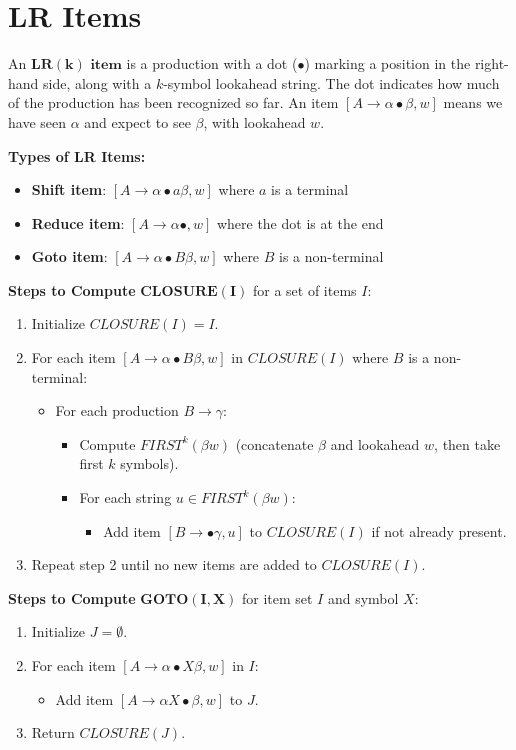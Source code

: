 \section{LR Items}

An $\mathbf{LR(k) \text{ item}}$ is a production with a dot ($\bullet$) marking a position in the right-hand side, along with a $k$-symbol lookahead string. The dot indicates how much of the production has been recognized so far. An item $[A \to \alpha \bullet \beta, w]$ means we have seen $\alpha$ and expect to see $\beta$, with lookahead $w$.

\textbf{Types of LR Items:}
\begin{itemize}
\item \textbf{Shift item}: $[A \to \alpha \bullet a \beta, w]$ where $a$ is a terminal
\item \textbf{Reduce item}: $[A \to \alpha \bullet, w]$ where the dot is at the end
\item \textbf{Goto item}: $[A \to \alpha \bullet B \beta, w]$ where $B$ is a non-terminal
\end{itemize}

\textbf{Steps to Compute} $\mathbf{CLOSURE(I)}$ for a set of items $I$:
\begin{enumerate}
\item Initialize $CLOSURE(I) = I$.
\item For each item $[A \to \alpha \bullet B \beta, w]$ in $CLOSURE(I)$ where $B$ is a non-terminal:
   \begin{itemize}
   \item For each production $B \to \gamma$:
     \begin{itemize}
     \item Compute $FIRST^k(\beta w)$ (concatenate $\beta$ and lookahead $w$, then take first $k$ symbols).
     \item For each string $u \in FIRST^k(\beta w)$:
       \begin{itemize}
       \item Add item $[B \to \bullet \gamma, u]$ to $CLOSURE(I)$ if not already present.
       \end{itemize}
     \end{itemize}
   \end{itemize}
\item Repeat step 2 until no new items are added to $CLOSURE(I)$.
\end{enumerate}

\textbf{Steps to Compute} $\mathbf{GOTO(I, X)}$ for item set $I$ and symbol $X$:
\begin{enumerate}
\item Initialize $J = \emptyset$.
\item For each item $[A \to \alpha \bullet X \beta, w]$ in $I$:
   \begin{itemize}
   \item Add item $[A \to \alpha X \bullet \beta, w]$ to $J$.
   \end{itemize}
\item Return $CLOSURE(J)$.
\end{enumerate}
